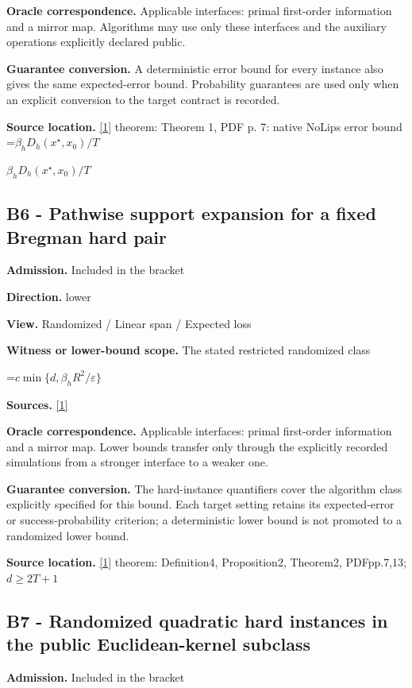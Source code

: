 \documentclass[10pt,a4paper]{article}
\newcommand{\AtlasMath}[1]{\par\begingroup\centering\setbox0=\hbox{$\displaystyle #1$}\ifdim\wd0>1.4\linewidth\typeout{ATLAS WIDE FORMULA: \the\wd0}\fi\ifdim\wd0>\linewidth\resizebox{\linewidth}{!}{\box0}\else\box0\fi\par\endgroup}
\newcommand{\AtlasInlineMath}[1]{\begingroup\setbox0=\hbox{$#1$}\ifdim\wd0>.4\linewidth\endgroup\AtlasMath{#1}\else\endgroup$#1$\fi}
\begin{document}
\textbf{Oracle correspondence.} Applicable interfaces: primal first-order information and a mirror map. Algorithms may use only these interfaces and the auxiliary operations explicitly declared public.

\textbf{Guarantee conversion.} A deterministic error bound for every instance also gives the same expected-error bound. Probability guarantees are used only when an explicit conversion to the target contract is recorded.

\textbf{Source location.} \href{https://arxiv.org/pdf/1911.08510v3}{[1]} theorem: Theorem 1, PDF p. 7: native NoLips error bound \AtlasInlineMath{\beta_hD_h(x^\star,x_0)/T}

\subsection{B6 - Pathwise support expansion for a fixed Bregman hard pair}
\textbf{Admission.} Included in the bracket

\textbf{Direction.} lower

\textbf{View.} Randomized / Linear span / Expected loss

\textbf{Witness or lower-bound scope.} The stated restricted randomized class

\AtlasMath{c\min\{d,\beta_hR^2/\varepsilon\}}
\textbf{Sources.} \href{https://arxiv.org/pdf/1911.08510v3}{[1]}

\textbf{Oracle correspondence.} Applicable interfaces: primal first-order information and a mirror map. Lower bounds transfer only through the explicitly recorded simulations from a stronger interface to a weaker one.

\textbf{Guarantee conversion.} The hard-instance quantifiers cover the algorithm class explicitly specified for this bound. Each target setting retains its expected-error or success-probability criterion; a deterministic lower bound is not promoted to a randomized lower bound.

\textbf{Source location.} \href{https://arxiv.org/pdf/1911.08510v3}{[1]} theorem: Definition4, Proposition2, Theorem2, PDFpp.7,13; $d\ge 2T+1$

\subsection{B7 - Randomized quadratic hard instances in the public Euclidean-kernel subclass}
\textbf{Admission.} Included in the bracket
\end{document}
